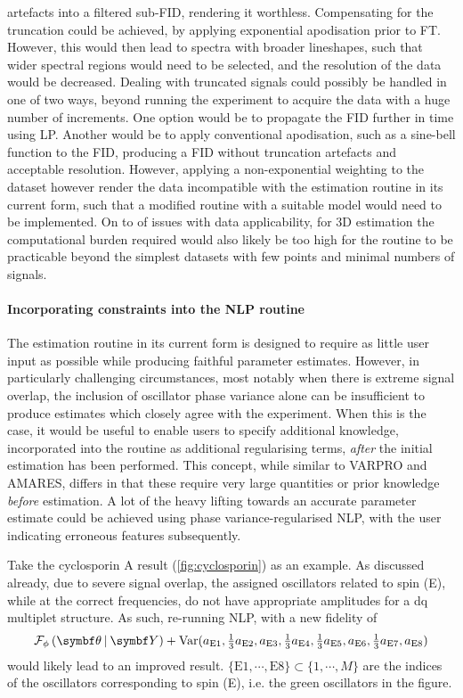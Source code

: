artefacts into a filtered sub-\ac{FID}, rendering it worthless.
Compensating for the truncation could be achieved, by applying exponential
apodisation prior to \ac{FT}. However, this would then lead to spectra with
broader lineshapes, such that wider spectral regions would need to be selected,
and the resolution of the data would be decreased.
Dealing with
truncated signals could possibly be handled in one of two ways, beyond running
the experiment to acquire the data with a huge number of increments. One
option would be to propagate the \ac{FID} further in time using \ac{LP}.
Another would be to apply conventional apodisation, such as a sine-bell
function to the \ac{FID}, producing a \ac{FID} without truncation artefacts and
acceptable resolution. However, applying a non-exponential weighting to the
dataset however render the data incompatible with the estimation routine in its
current form, such that a modified routine with a suitable model would need to
be implemented. On to of issues with data applicability, for \ac{3D}
estimation the computational burden required would also likely be too high for
the routine to be practicable beyond the simplest datasets with few points and
minimal numbers of signals.

\paragraph{Incorporating constraints into the \ac{NLP} routine}
The estimation routine in its current form is designed to require as little
user input as possible while producing faithful parameter estimates. However,
in particularly challenging circumstances, most notably when
there is extreme signal overlap, the inclusion of oscillator phase variance
alone can be insufficient to produce estimates which closely agree with the
experiment. When this is the case, it would be useful to enable users to
specify additional knowledge, incorporated into the routine as additional
regularising terms, \emph{after} the initial estimation has been performed.
This concept, while similar to \ac{VARPRO} and \ac{AMARES}, differs in that
these require very large quantities or prior knowledge \emph{before}
estimation. A lot of the heavy lifting towards an accurate parameter estimate
could be achieved using phase variance-regularised \ac{NLP}, with the user
indicating erroneous features subsequently.

Take the cyclosporin A result (\cref{fig:cyclosporin}) as an example. As
discussed already, due to severe signal overlap, the assigned oscillators
related to spin (E), while at the correct frequencies, do not have appropriate
amplitudes for a dq multiplet structure. As such, re-running \ac{NLP}, with a
new fidelity of
\[
    \FphithY + \Var(
        a_{\text{E}1},
        \tfrac{1}{3} a_{\text{E}2},
        a_{\text{E}3},
        \tfrac{1}{3} a_{\text{E}4},
        \tfrac{1}{3} a_{\text{E}5},
        a_{\text{E}6},
        \tfrac{1}{3} a_{\text{E}7},
        a_{\text{E}8}
    )
\]
would likely lead to an improved result.
$\lbrace \text{E}1, \cdots, \text{E}8 \rbrace \subset \lbrace 1, \cdots, M \rbrace$ are the
indices of the oscillators corresponding to spin (E), i.e. the green
oscillators in the figure.
